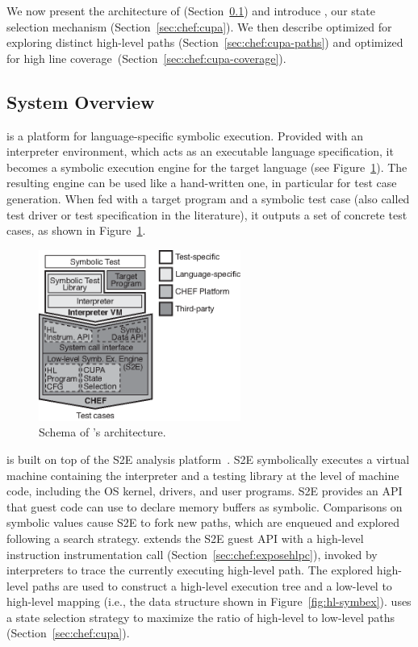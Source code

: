 We now present the architecture of \chef (Section~\ref{sec:chef:architecture}) and introduce \cupa, our state selection mechanism (Section~\ref{sec:chef:cupa}). We then describe \cupa optimized for exploring distinct high-level paths (Section~\ref{sec:chef:cupa-paths}) and optimized for high line coverage~(Section~\ref{sec:chef:cupa-coverage}).

\subsection{System Overview}
\label{sec:chef:architecture}

\chef is a platform for language-specific symbolic execution. Provided with an interpreter environment, which acts as an executable language specification, it becomes a symbolic execution engine for the target language (see Figure~\ref{fig:system-arch}).
%
The resulting engine can be used like a hand-written one, in particular for test case generation. When fed with a target program and a symbolic test case (also called test driver or test specification in the literature), it outputs a set of concrete test cases, as shown in Figure~\ref{fig:system-arch}.

\begin{figure}
  \centering
  \includegraphics[width=2.6in]{figures/chef/system-arch}
  \caption{Schema of \chef's architecture.}
  \label{fig:system-arch}
\end{figure}

\chef is built on top of the S2E analysis platform~\cite{s2eSystem}. S2E symbolically executes a virtual machine containing the interpreter and a testing library at the level of machine code,  including the OS kernel, drivers, and user programs.  S2E provides an API that guest code can use to declare memory buffers as symbolic. Comparisons on symbolic values cause S2E to fork new paths, which are enqueued and explored following a search strategy.
%
\chef extends the S2E guest API with a high-level instruction instrumentation call (Section~\ref{sec:chef:exposehlpc}), invoked by interpreters to trace the currently executing high-level path.  The explored high-level paths are used to construct a high-level execution tree and a low-level to high-level mapping (i.e., the data structure shown in Figure~\ref{fig:hl-symbex}).  \chef uses a state selection strategy to maximize the ratio of high-level to low-level paths (Section~\ref{sec:chef:cupa}).
\fi

